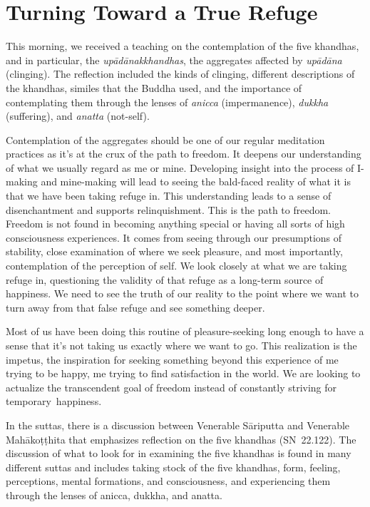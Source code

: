
\chapter{Turning Toward a True Refuge}

This morning, we received a teaching on the contemplation of the five khandhas, and in particular, the \emph{upādānakkhandhas}, the aggregates affected by \emph{upādāna} (clinging). The reflection included the kinds of clinging, different descriptions of the khandhas, similes that the Buddha used, and the importance of contemplating them through the lenses of \emph{anicca} (impermanence), \emph{dukkha} (suffering), and \emph{anatta} (not-self).

Contemplation of the aggregates should be one of our regular meditation practices as it's at the crux of the path to freedom. It deepens our understanding of what we usually regard as me or mine. Developing insight into the process of I-making and mine-making will lead to seeing the bald-faced reality of what it is that we have been taking refuge in. This understanding leads to a sense of disenchantment and supports relinquishment. This is the path to freedom. Freedom is not found in becoming anything special or having all sorts of high consciousness experiences. It comes from seeing through our presumptions of stability, close examination of where we seek pleasure, and most importantly, contemplation of the perception of self. We look closely at what we are taking refuge in, questioning the validity of that refuge as a long-term source of happiness. We need to see the truth of our reality to the point where we want to turn away from that false refuge and see something deeper.

Most of us have been doing this routine of pleasure-seeking long enough to have a sense that it's not taking us exactly where we want to go. This realization is the impetus, the inspiration for seeking something beyond this experience of me trying to be happy, me trying to find satisfaction in the world. We are looking to actualize the transcendent goal of freedom instead of constantly striving for \mbox{temporary happiness.}

In the suttas, there is a discussion between Venerable Sāriputta and Venerable Mahākoṭṭhita that emphasizes reflection on the five khandhas \mbox{(SN 22.122)}. The discussion of what to look for in examining the five khandhas is found in many different suttas and includes taking stock of the five khandhas, form, feeling, perceptions, mental formations, and consciousness, and experiencing them through the lenses of anicca, dukkha, and anatta.

